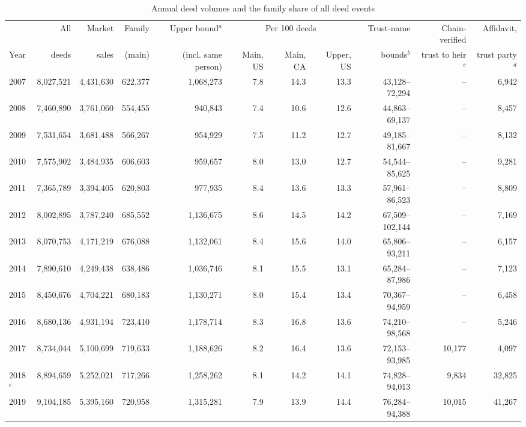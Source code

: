 \begin{table}[!t]\centering
\caption{Annual deed volumes and the family share of all deed events}
\label{tab:volumes}
{\scriptsize\setlength{\tabcolsep}{2.5pt}
\begin{adjustbox}{max width=\textwidth}\begin{tabular}{lrrrrrrrrrr}\toprule
 & All & Market & Family & Upper bound$^{a}$ & \multicolumn{3}{c}{Per 100 deeds} & Trust-name & Chain-verified & Affidavit, \\
Year & deeds & sales & (main) & (incl. same person) & Main, US & Main, CA & Upper, US & bounds$^{b}$ & trust to heir$^{c}$ & trust party$^{d}$ \\
\midrule
2007 & 8,027,521 & 4,431,630 & 622,377 & 1,068,273 & 7.8 & 14.3 & 13.3 & 43,128--72,294 & -- & 6,942 \\
2008 & 7,460,890 & 3,761,060 & 554,455 & 940,843 & 7.4 & 10.6 & 12.6 & 44,863--69,137 & -- & 8,457 \\
2009 & 7,531,654 & 3,681,488 & 566,267 & 954,929 & 7.5 & 11.2 & 12.7 & 49,185--81,667 & -- & 8,132 \\
2010 & 7,575,902 & 3,484,935 & 606,603 & 959,657 & 8.0 & 13.0 & 12.7 & 54,544--85,625 & -- & 9,281 \\
2011 & 7,365,789 & 3,394,405 & 620,803 & 977,935 & 8.4 & 13.6 & 13.3 & 57,961--86,523 & -- & 8,809 \\
2012 & 8,002,895 & 3,787,240 & 685,552 & 1,136,675 & 8.6 & 14.5 & 14.2 & 67,509--102,144 & -- & 7,169 \\
2013 & 8,070,753 & 4,171,219 & 676,088 & 1,132,061 & 8.4 & 15.6 & 14.0 & 65,806--93,211 & -- & 6,157 \\
2014 & 7,890,610 & 4,249,438 & 638,486 & 1,036,746 & 8.1 & 15.5 & 13.1 & 65,284--87,986 & -- & 7,123 \\
2015 & 8,450,676 & 4,704,221 & 680,183 & 1,130,271 & 8.0 & 15.4 & 13.4 & 70,367--94,959 & -- & 6,458 \\
2016 & 8,680,136 & 4,931,194 & 723,410 & 1,178,714 & 8.3 & 16.8 & 13.6 & 74,210--98,568 & -- & 5,246 \\
2017 & 8,734,044 & 5,100,699 & 719,633 & 1,188,626 & 8.2 & 16.4 & 13.6 & 72,153--93,985 & 10,177 & 4,097 \\
2018$^{e}$ & 8,894,659 & 5,252,021 & 717,266 & 1,258,262 & 8.1 & 14.2 & 14.1 & 74,828--94,013 & 9,834 & 32,825 \\
2019 & 9,104,185 & 5,395,160 & 720,958 & 1,315,281 & 7.9 & 13.9 & 14.4 & 76,284--94,388 & 10,015 & 41,267 \\

\end{tabular}
\end{adjustbox}}
\end{table}
